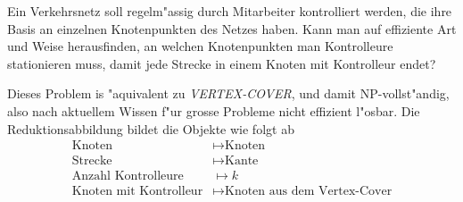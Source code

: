 Ein Verkehrsnetz soll regelm"assig durch Mitarbeiter
kontrolliert werden, die ihre Basis an einzelnen Knotenpunkten
des Netzes haben.
Kann man auf effiziente Art und Weise herausfinden, an welchen
Knotenpunkten man Kontrolleure stationieren muss, damit jede
Strecke in einem Knoten mit Kontrolleur endet?

\begin{loesung}
Dieses Problem is "aquivalent zu \textsl{VERTEX-COVER},
und damit NP-vollst"andig, also nach aktuellem Wissen f"ur
grosse Probleme nicht effizient l"osbar. Die Reduktionsabbildung
bildet die Objekte wie folgt ab
\begin{align*}
\text{Knoten}&\mapsto \text{Knoten}\\
\text{Strecke}&\mapsto \text{Kante}\\
\text{Anzahl Kontrolleure}&\mapsto k\\
\text{Knoten mit Kontrolleur}&\mapsto\text{Knoten aus dem Vertex-Cover}
\end{align*}
\end{loesung}
